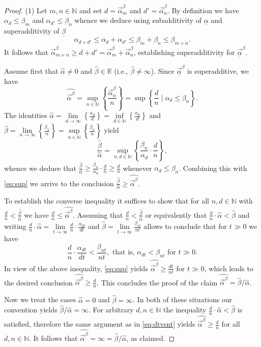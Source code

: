 \documentclass[10pt,a4paper]{amsart}
\newcommand{\N}{{\mathbb N}}
\newcommand{\R}{{\mathbb R}}
\def\a{\ensuremath{\alpha}}
\newcommand{\au}{\overrightarrow{\alpha}}
\def\b{\ensuremath{\beta}}
\def\ua{\ensuremath{\underline{\alpha}}}
\newcommand{\uau}{\overrightarrow{\ua}}
\def\ub{\ensuremath{\underline{\beta}}}
\newcommand{\wa}{\widehat{\alpha}}
\newcommand{\wb}{\widehat{\beta}}
\begin{document}
\begin{proof}
(1) Let $m,n\in\N$ and set $d=\au^\b_m$ and $d'=\au^\b_n$. By definition we have $\a_d\leq \b_m$ and $\a_{d'}\leq \b_n$ whence we deduce using subadditivity of $\ua$ and superadditivity of $\ub$
\[
\a_{d+d'}\leq \a_d+\a_{d'}\leq \b_m+\b_n\leq \b_{m+n}.
\]
It follows that $\au^\b_{m+n}\geq d+d'=\au^\b_m+\au^\b_n$, establishing superadditivity for $\uau^\b$.

Assume first that $\wa\neq 0$ and $\wb\in \R$ (i.e., $\wb\neq \infty$). 
Since $\uau^\b$ is superadditive, we have 
\begin{equation}
\label{eq:sup}
\widehat{\au^\b}=\sup_{n\in \N}\left\{ \frac{\au^\b_n}{n} \right\}=\sup \left \{\frac{d}{n} \mid \a_d\leq \b_n \right \}.
\end{equation}
The identities $\wa=\lim\limits_{d\to\infty}\left\{ \frac{\a_d}{d} \right\}=\inf\limits_{d\in\N}\left\{ \frac{\a_d}{d} \right\}$ and $\wb=\lim\limits_{n\to \infty}\left\{ \frac{\b_n}{n} \right\}=\sup\limits_{n\in\N}\left\{ \frac{\b_n}{n} \right\}$ yield 
\[
\frac{\wb}{\wa}=\sup\limits_{n,d\in \N}\left\{ \frac{\b_n}{\a_d}\cdot \frac{d}{n} \right\},
\]
whence we deduce that $\frac{\wb}{\wa}\geq \frac{\b_n}{\a_d}\cdot \frac{d}{n}\geq  \frac{d}{n}$ whenever $\a_d\leq \b_n$.
Combining this with \eqref{eq:sup} we arrive to the conclusion $\frac{\wb}{\wa}\geq \widehat{\au^\b}$.

To establish the converse inequality it suffices to show that for all $n,d\in\N$ with $\frac{d}{n}<\frac{\wb}{\wa}$ we have  $\frac{d}{n}\leq  \widehat{\au^\b}$. Assuming that $\frac{d}{n}<\frac{\wb}{\wa}$ or equivalently that $\frac{d}{n} \cdot \wa<{\wb}$  and writing $\frac{d}{n} \cdot \wa=\lim\limits_{t\to \infty}\frac{d}{n}\cdot\frac{\a_{dt}}{dt}$ and $\wb=\lim\limits_{t\to \infty}\frac{\b_{nt}}{nt}$ allows to conclude that for $t\gg 0$ we have 
\begin{equation}
\label{eq:dtvsnt}
\frac{d}{n}\cdot\frac{\a_{dt}}{dt}<\frac{\b_{nt}}{nt}, \text{ that is, } \a_{dt}<\b_{nt} \text{ for } t\gg0.
\end{equation}
In view of the above inequality, \eqref{eq:sup} yields $\widehat{\au^\b}\geq \frac{dt}{nt}$ for $ t\gg0$, which leads to the desired conclusion  $\widehat{\au^\b}\geq \frac{d}{n}$. This concludes the proof of the claim  $\widehat{\au^\b}=\widehat{\b}/\widehat{\a}$.

Now we treat the cases $\wa=0$ and $\wb=\infty$. In both of these situations our convention yields $\wb/\wa=\infty$. For arbitrary $d,n\in \N$ the inequality $\frac{d}{n} \cdot \wa<{\wb}$ is satisfied, therefore the same argument as in \eqref{eq:dtvsnt} yields $\widehat{\au^\b}\geq \frac{d}{n}$ for all $d,n\in \N$. It follows that $\widehat{\au^\b}=\infty=\wb/\wa$, as claimed.


\end{proof}
\end{document}
